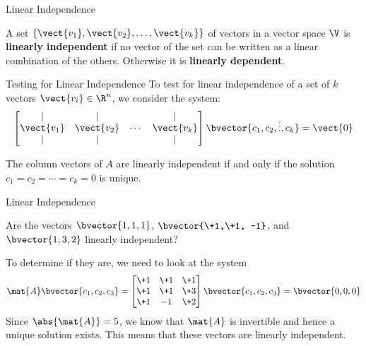 \documentclass{beamer}
\begin{document}
\begin{frame}{Linear Independence}
\begin{definition}
A set $\left\{\vect{v_1},\vect{v_2},\dots,\vect{v_k}\right\}$ of vectors in a vector space $\V$ is \textbf{linearly independent} if no vector of the set can be written as a linear combination of the others. Otherwise it is \textbf{linearly dependent}.
\end{definition}\pause
\begin{block}{Testing for Linear Independence}
To test for linear independence of a set of $k$ vectors $\vect{v_i}\in\R^n$, we consider the system:
\begin{equation*}
\begin{bmatrix}
\mid       & \mid       &       & \mid       \\
\vect{v_1} & \vect{v_2} & \cdots & \vect{v_k} \\
\mid       & \mid       &       & \mid       \\
\end{bmatrix}
\bvector{c_1,c_2,\vdots,c_k}=\vect{0}
\end{equation*}

The column vectors of $A$ are linearly independent if and only if the solution $c_1=c_2=\cdots=c_k=0$ is unique.
\end{block}
\end{frame}

\begin{frame}{Linear Independence}
\begin{example}
Are the vectors $\bvector{1,1,1}$, $\bvector{\+1,\+1, -1}$, and $\bvector{1,3,2}$ linearly independent?\pause

To determine if they are, we need to look at the system
\begin{equation*}
\mat{A}\bvector{c_1,c_2,c_3}=
\begin{bmatrix}
\+1 & \+1 & \+1 \\
\+1 & \+1 & \+3 \\
\+1 &  -1 & \+2 \\
\end{bmatrix}
\bvector{c_1,c_2,c_3}=\bvector{0,0,0}
\end{equation*}\pause
Since $\abs{\mat{A}}=5$, we know that $\mat{A}$ is invertible and hence a unique solution exists. This means that these vectors are linearly independent.
\end{example}
\end{frame}
\end{document}
